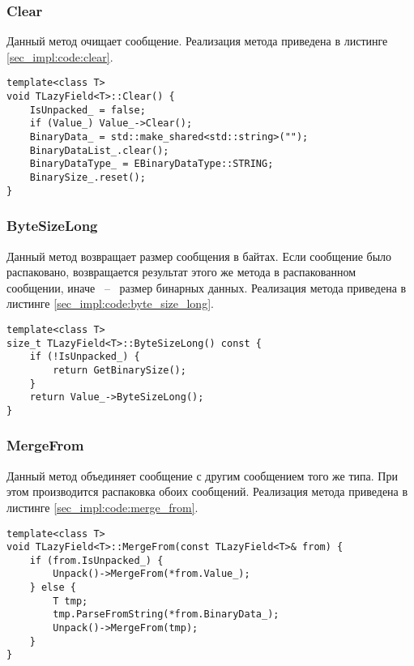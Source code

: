 \pagebreak
\subsubsection{Clear}

Данный метод очищает сообщение.
Реализация метода приведена в листинге \ref{sec_impl:code:clear}.

\begin{lstlisting}[style=CodeListing, label=sec_impl:code:clear, caption={Реализация метода Clear}]
template<class T>
void TLazyField<T>::Clear() {
    IsUnpacked_ = false;
    if (Value_) Value_->Clear();
    BinaryData_ = std::make_shared<std::string>("");
    BinaryDataList_.clear();
    BinaryDataType_ = EBinaryDataType::STRING;
    BinarySize_.reset();
}
\end{lstlisting}
\vspace{-1em}
\subsubsection{ByteSizeLong} 

Данный метод возвращает размер сообщения в байтах. Если сообщение было распаковано, возвращается результат этого же метода в распакованном сообщении, иначе ~--~ размер бинарных данных.
Реализация метода приведена в листинге \ref{sec_impl:code:byte_size_long}.

\noindent\begin{minipage}{\linewidth}
\begin{lstlisting}[style=CodeListing, label=sec_impl:code:byte_size_long, caption={Реализация метода ByteSizeLong}]
template<class T>
size_t TLazyField<T>::ByteSizeLong() const {
    if (!IsUnpacked_) {
        return GetBinarySize();
    }
    return Value_->ByteSizeLong();
}
\end{lstlisting}
\end{minipage}

\subsubsection{MergeFrom}

Данный метод объединяет сообщение с другим сообщением того же типа. При этом производится распаковка обоих сообщений.
Реализация метода приведена в листинге \ref{sec_impl:code:merge_from}.

\noindent\begin{minipage}{\linewidth}
\begin{lstlisting}[style=CodeListing, label=sec_impl:code:merge_from, caption={Реализация метода MergeFrom}]
template<class T>
void TLazyField<T>::MergeFrom(const TLazyField<T>& from) {
    if (from.IsUnpacked_) {
        Unpack()->MergeFrom(*from.Value_);
    } else {
        T tmp;
        tmp.ParseFromString(*from.BinaryData_);
        Unpack()->MergeFrom(tmp);
    }
}
\end{lstlisting}
\end{minipage}

